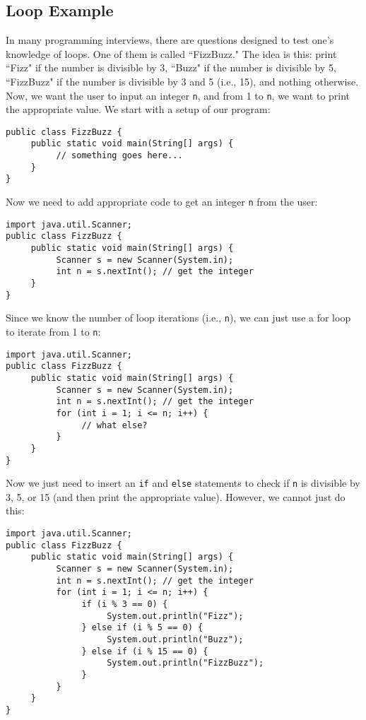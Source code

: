 \subsection{Loop Example}
In many programming interviews, there are questions designed to test one's knowledge of loops. One of them is called ``FizzBuzz." The idea is this: print ``Fizz" if the number is divisible by 3, ``Buzz" if the number is divisible by 5, ``FizzBuzz" if the number is divisible by 3 and 5 (i.e., 15), and nothing otherwise. Now, we want the user to input an integer \texttt{n}, and from 1 to \texttt{n}, we want to print the appropriate value. We start with a setup of our program:
\begin{lstlisting}
public class FizzBuzz {
     public static void main(String[] args) {
          // something goes here...
     }
}
\end{lstlisting}
Now we need to add appropriate code to get an integer \texttt{n} from the user:
\begin{lstlisting}
import java.util.Scanner;
public class FizzBuzz {
     public static void main(String[] args) {
          Scanner s = new Scanner(System.in);
          int n = s.nextInt(); // get the integer
     }
}
\end{lstlisting}
Since we know the number of loop iterations (i.e., \texttt{n}), we can just use a for loop to iterate from 1 to \texttt{n}:
\begin{lstlisting}
import java.util.Scanner;
public class FizzBuzz {
     public static void main(String[] args) {
          Scanner s = new Scanner(System.in);
          int n = s.nextInt(); // get the integer
          for (int i = 1; i <= n; i++) {
               // what else?
          }
     }
}
\end{lstlisting}
Now we just need to insert an \texttt{if} and \texttt{else} statements to check if \texttt{n} is divisible by 3, 5, or 15 (and then print the appropriate value). However, we cannot just do this:
\begin{lstlisting}
import java.util.Scanner;
public class FizzBuzz {
     public static void main(String[] args) {
          Scanner s = new Scanner(System.in);
          int n = s.nextInt(); // get the integer
          for (int i = 1; i <= n; i++) {
               if (i % 3 == 0) {
                    System.out.println("Fizz");
               } else if (i % 5 == 0) {
                    System.out.println("Buzz");
               } else if (i % 15 == 0) {
                    System.out.println("FizzBuzz");
               }
          }
     }
}
\end{lstlisting}
